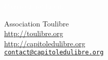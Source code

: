 \documentclass{cdl_sponsor}
\begin{document}
\renewcommand{\tablename}{\bsc{Tableau}}

\thispagestyle{empty} %



\parbox[t]{1.0\textwidth}{
	\flushright \fontsize{55pt}{75pt}\selectfont %
	\vspace*{0.7cm} %

	\textcolor{white}{
		\hfill \textsc{Capitole du Libre} \\
		\fontsize{36pt}{50pt}
	}
	\par

	\vspace*{0.7cm} %
}




\vfill %

{\centering \large
\hfill Association Toulibre \\
\hfill \url{http://toulibre.org} \\
\hfill \url{http://capitoledulibre.org} \\
\hfill \href{mailto:contact@capitoledulibre.org}{\texttt{contact@capitoledulibre.org}} \\
}
\clearpage
\end{document}
